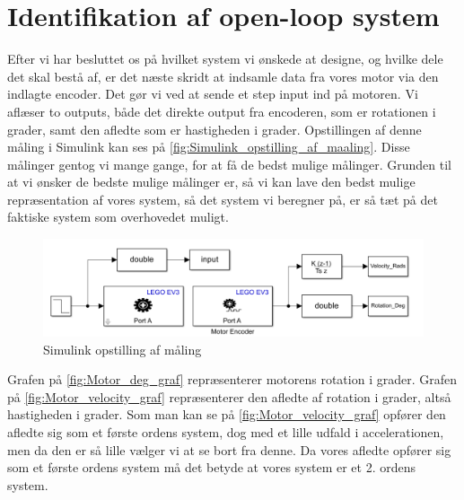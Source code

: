 \graphicspath{{Chapters/Identifikation_af_open_loop_system/}}

\section{Identifikation af open-loop system}

Efter vi har besluttet os på hvilket system vi ønskede at designe, og hvilke dele det skal bestå af, er det næste skridt at indsamle data fra vores motor via den indlagte encoder. Det gør vi ved at sende et step input ind på motoren. Vi aflæser to outputs, både det direkte output fra encoderen, som er rotationen i grader, samt den afledte som er hastigheden i grader. Opstillingen af denne måling i Simulink kan ses på \autoref{fig:Simulink_opstilling_af_maaling}. Disse målinger gentog vi mange gange, for at få de bedst mulige målinger. Grunden til at vi ønsker de bedste mulige målinger er, så vi kan lave den bedst mulige repræsentation af vores system, så det system vi beregner på, er så tæt på det faktiske system som overhovedet muligt.
  
\begin{figure}[H]
	\centering
	\includegraphics[width = 400pt]{Img/Simulink_opstilling_af_maaling.png}
	\caption{Simulink opstilling af måling}
	\label{fig:Simulink_opstilling_af_maaling}
\end{figure}

Grafen på \autoref{fig:Motor_deg_graf} repræsenterer motorens rotation i grader. Grafen på \autoref{fig:Motor_velocity_graf} repræsenterer den afledte af rotation i grader, altså hastigheden i grader. Som man kan se på \autoref{fig:Motor_velocity_graf} opfører den afledte sig som et første ordens system, dog med et lille udfald i accelerationen, men da den er så lille vælger vi at se bort fra denne. Da vores afledte opfører sig som et første ordens system må det betyde at vores system er et 2. ordens system. 


